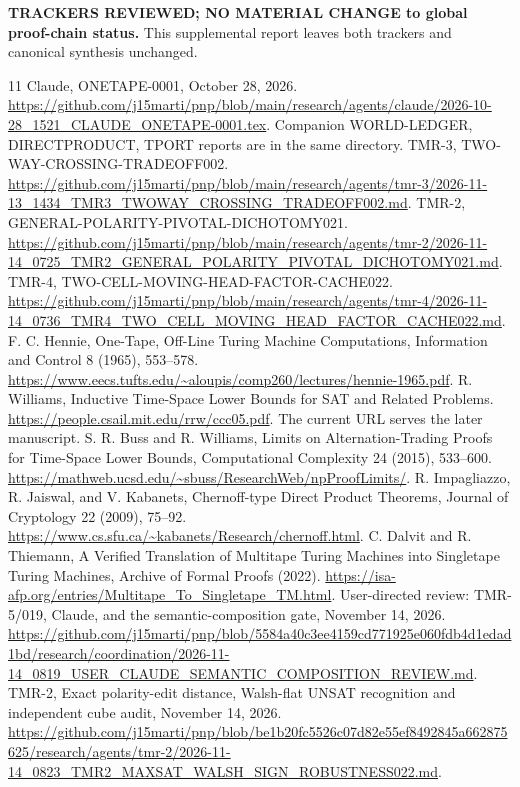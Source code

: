 \documentclass[11pt]{article}
\begin{document}
\textbf{TRACKERS REVIEWED; NO MATERIAL CHANGE to global proof-chain status.}
This supplemental report leaves both trackers and canonical synthesis unchanged.

\begin{thebibliography}{11}
Claude, ONETAPE-0001, October 28, 2026.
\url{https://github.com/j15marti/pnp/blob/main/research/agents/claude/2026-10-28_1521_CLAUDE_ONETAPE-0001.tex}.
Companion WORLD-LEDGER, DIRECTPRODUCT, TPORT reports are in the same directory.
TMR-3, TWO-WAY-CROSSING-TRADEOFF002.
\url{https://github.com/j15marti/pnp/blob/main/research/agents/tmr-3/2026-11-13_1434_TMR3_TWOWAY_CROSSING_TRADEOFF002.md}.
TMR-2, GENERAL-POLARITY-PIVOTAL-DICHOTOMY021.
\url{https://github.com/j15marti/pnp/blob/main/research/agents/tmr-2/2026-11-14_0725_TMR2_GENERAL_POLARITY_PIVOTAL_DICHOTOMY021.md}.
TMR-4, TWO-CELL-MOVING-HEAD-FACTOR-CACHE022.
\url{https://github.com/j15marti/pnp/blob/main/research/agents/tmr-4/2026-11-14_0736_TMR4_TWO_CELL_MOVING_HEAD_FACTOR_CACHE022.md}.
F. C. Hennie, One-Tape, Off-Line Turing Machine Computations, Information and Control 8 (1965), 553--578.
\url{https://www.eecs.tufts.edu/~aloupis/comp260/lectures/hennie-1965.pdf}.
R. Williams, Inductive Time-Space Lower Bounds for SAT and Related Problems.
\url{https://people.csail.mit.edu/rrw/ccc05.pdf}.
The current URL serves the later manuscript.
S. R. Buss and R. Williams, Limits on Alternation-Trading Proofs for Time-Space Lower Bounds, Computational Complexity 24 (2015), 533--600.
\url{https://mathweb.ucsd.edu/~sbuss/ResearchWeb/npProofLimits/}.
R. Impagliazzo, R. Jaiswal, and V. Kabanets, Chernoff-type Direct Product Theorems, Journal of Cryptology 22 (2009), 75--92.
\url{https://www.cs.sfu.ca/~kabanets/Research/chernoff.html}.
C. Dalvit and R. Thiemann, A Verified Translation of Multitape Turing Machines into Singletape Turing Machines, Archive of Formal Proofs (2022).
\url{https://isa-afp.org/entries/Multitape_To_Singletape_TM.html}.
User-directed review: TMR-5/019, Claude, and the semantic-composition gate, November 14, 2026.
\url{https://github.com/j15marti/pnp/blob/5584a40c3ee4159cd771925e060fdb4d1edad1bd/research/coordination/2026-11-14_0819_USER_CLAUDE_SEMANTIC_COMPOSITION_REVIEW.md}.
TMR-2, Exact polarity-edit distance, Walsh-flat UNSAT recognition and independent cube audit, November 14, 2026.
\url{https://github.com/j15marti/pnp/blob/be1b20fc5526c07d82e55ef8492845a662875625/research/agents/tmr-2/2026-11-14_0823_TMR2_MAXSAT_WALSH_SIGN_ROBUSTNESS022.md}.
\end{thebibliography}
\end{document}
